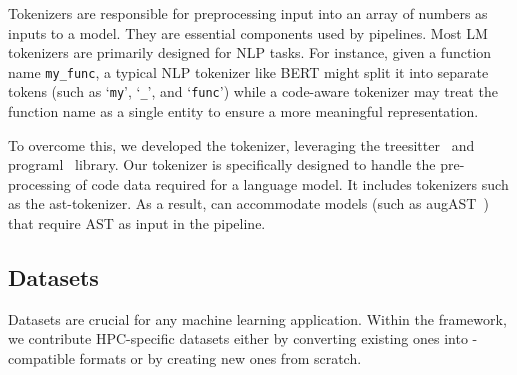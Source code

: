 Tokenizers are responsible for preprocessing input into an array of numbers as inputs to a model. They are essential components used by pipelines. Most LM tokenizers are primarily designed for NLP tasks. 
For instance, given a function name \texttt{my\_func}, a typical NLP tokenizer like BERT might split it into separate tokens (such as `\texttt{my}', `\texttt{\_}', and `\texttt{func}') while a code-aware tokenizer may treat the function name as a single entity to ensure a more meaningful representation. %

To overcome this, we developed the \ourwork tokenizer, leveraging the treesitter~\cite{treesitter} and programl~\cite{programl} library. Our tokenizer is specifically designed to handle the pre-processing of code data required for a language model. It includes tokenizers such as the ast-tokenizer.
As a result, \ourwork can accommodate models (such as augAST~\cite{chen2023learning-dataset}) that require AST as input in the pipeline. %

\subsection{Datasets}
\label{sec-datasets}
Datasets are crucial for any machine learning application. 
Within the \ourwork framework, we contribute HPC-specific datasets either by converting existing ones into \face-compatible formats or by creating new ones from scratch. 



